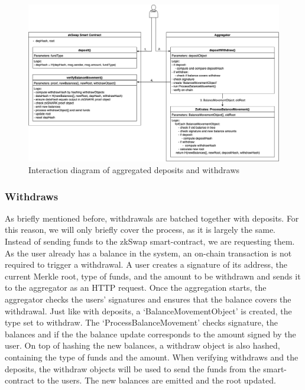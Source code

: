 \documentclass[../../thesis.tex]{subfiles}
\begin{document}
\begin{figure}[h]
    \centerline{\includegraphics[totalheight=9cm]{diagrams/depositWithdrawAggregated.png}}
    \caption{Interaction diagram of aggregated deposits and withdraws}
    \label{fig:depWithAggr}
\end{figure}

\subsubsection{Withdraws} \label{with}
As briefly mentioned before, withdrawals are batched together with deposits. For this reason, we will only briefly cover the process, as it is largely the same. Instead of sending funds to the zkSwap smart-contract, we are requesting them. As the user already has a balance in the system, an on-chain transaction is not required to trigger a withdrawal. A user creates a signature of its address, the current Merkle root, type of funds, and the amount to be withdrawn and sends it to the aggregator as an HTTP request. Once the aggregation starts, the aggregator checks the users' signatures and ensures that the balance covers the withdrawal. Just like with deposits, a `BalanceMovementObject' is created, the type set to withdraw. The `ProcessBalanceMovement' checks signature, the balances and if the the balance update corresponds to the amount signed by the user. On top of hashing the new balances, a withdraw object is also hashed, containing the type of funds and the amount. When verifying withdraws and the deposits, the withdraw objects will be used to send the funds from the smart-contract to the users. The new balances are emitted and the root updated. 
\end{document}
